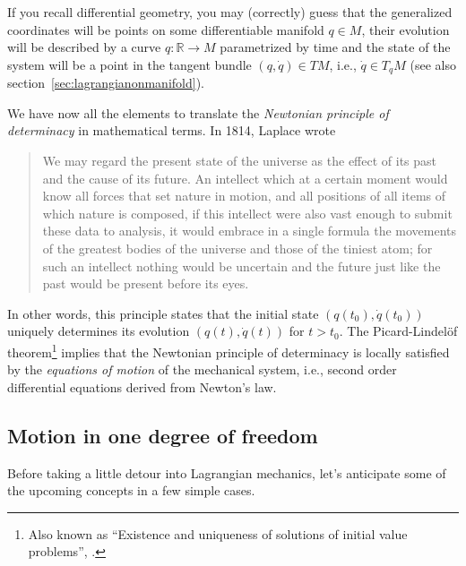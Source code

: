 \documentclass[english,fontsize=11pt,paper=b5]{scrbook}
\theoremstyle{definition}
\begin{document}
  If you recall differential geometry, you may (correctly) guess that the generalized coordinates will be points on some differentiable manifold $q\in M$, their evolution will be described by a curve $q: \mathbb{R} \to M$ parametrized by time and the state of the system will be a point in the tangent bundle $(q, \dot q)\in TM$, i.e., $\dot q \in T_q M$ (see also section~\ref{sec:lagrangianonmanifold}).
  \medskip

  We have now all the elements to translate the \emph{Newtonian principle of determinacy} in mathematical terms.
  In 1814, Laplace \cite{book:laplace} wrote

  \begin{quotation}
    We may regard the present state of the universe as the effect of its past and the cause of its future. An intellect which at a certain moment would know all forces that set nature in motion, and all positions of all items of which nature is composed, if this intellect were also vast enough to submit these data to analysis, it would embrace in a single formula the movements of the greatest bodies of the universe and those of the tiniest atom; for such an intellect nothing would be uncertain and the future just like the past would be present before its eyes.
  \end{quotation}

  In other words, this principle states that the initial state $\left(q(t_0), \dot q(t_0)\right)$ uniquely determines its evolution $\left(q(t),\dot q(t)\right)$ for $t > t_0$.
  The Picard-Lindel\"of theorem\footnote{Also known as ``Existence and uniqueness of solutions of initial value problems'', \cite[Theorem 3.17]{book:knauf}.} implies that the Newtonian principle of determinacy is locally satisfied by the \emph{equations of motion} of the mechanical system, i.e., second order differential equations derived from Newton's law.

  \subsection{Motion in one degree of freedom}

  Before taking a little detour into Lagrangian mechanics, let's anticipate some of the upcoming concepts in a few simple cases.
\end{document}

